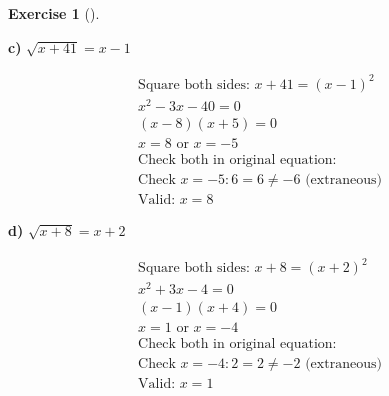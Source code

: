 \documentclass[
  letterpaper,
  DIV=11,
  numbers=noendperiod]{scrreprt}
\theoremstyle{definition}
\newtheorem{exercise}{Exercise}[chapter]
\theoremstyle{remark}
\begin{document}
\begin{exercise}[]
\begin{tcolorbox}
\textbf{c)} \(\displaystyle \sqrt{x + 41} = x - 1\)

\begin{align*}
\text{Square both sides: } x + 41 = (x - 1)^2 \\ x^2 - 3x - 40 = 0 \\ (x -8)(x + 5) = 0 \\ x = 8 \text{ or } x = -5 \\ \text{Check both in original equation:} \\ \text{Check } x=-5: 6 = 6 \neq -6 \text{ (extraneous)} \\ \text{Valid: } x = 8
\end{align*}

\textbf{d)} \(\displaystyle \sqrt{x + 8} = x + 2\)

\begin{align*}
\text{Square both sides: } x + 8 = (x + 2)^2 \\ x^2 + 3x - 4 = 0 \\ (x -1)(x + 4) = 0 \\ x = 1 \text{ or } x = -4 \\ \text{Check both in original equation:} \\ \text{Check } x=-4: 2 = 2 \neq -2 \text{ (extraneous)} \\ \text{Valid: } x = 1
\end{align*}

\end{tcolorbox}

\end{exercise}
\end{document}

